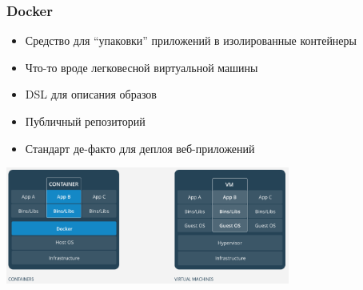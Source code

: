 \documentclass{../../slides-style}
\begin{document}
    \begin{frame}
        \frametitle{Docker}
        \begin{itemize}
            \item Средство для ``упаковки'' приложений в изолированные контейнеры
            \item Что-то вроде легковесной виртуальной машины
            \item DSL для описания образов 
            \item Публичный репозиторий
            \item Стандарт де-факто для деплоя веб-приложений
        \end{itemize}
        \begin{center}
            \includegraphics[width=0.7\textwidth]{docker.png}
        \end{center}
    \end{frame}
\end{document}
